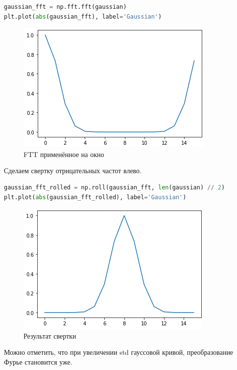 \begin{lstlisting}[language=Python]
gaussian_fft = np.fft.fft(gaussian)
plt.plot(abs(gaussian_fft), label='Gaussian')
\end{lstlisting}
\begin{figure}[H]
	\begin{center}
		\includegraphics[scale=1]{fig/lab08/lab8_5.png}
		\caption{FTT применённое на окно}
	\end{center}
\end{figure}

Сделаем свертку отрицательных частот влево.

\begin{lstlisting}[language=Python]
gaussian_fft_rolled = np.roll(gaussian_fft, len(gaussian) // 2)
plt.plot(abs(gaussian_fft_rolled), label='Gaussian')
\end{lstlisting}
\begin{figure}[H]
	\begin{center}
		\includegraphics[scale=1]{fig/lab08/lab8_6.png}
		\caption{Результат свертки}
	\end{center}
\end{figure}

Можно отметить, что при увеличении std гауссовой кривой, преобразование Фурье становится уже.


